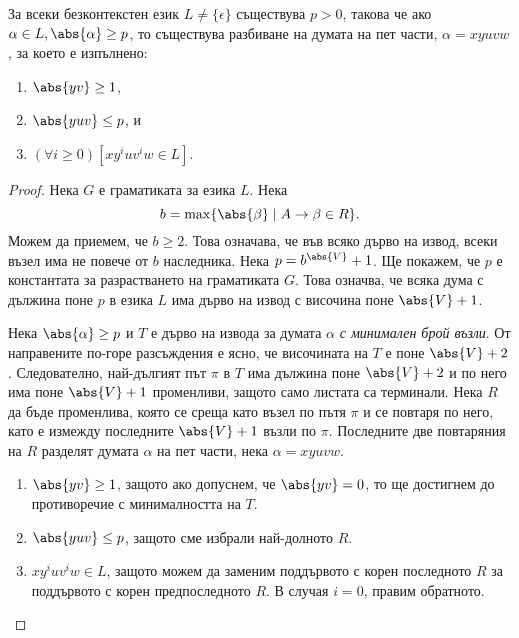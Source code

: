 \begin{lemma}
  \label{lem:pumping-context} 
  За всеки безконтекстен език $L\neq\{\epsilon\}$ съществува $p>0$, такова
  че ако $\alpha\in L, \abs{\alpha} \geq p$, то съществува разбиване на думата на пет части, $\alpha=xyuvw$,
  за което е изпълнено:
  \begin{enumerate}[1)]
  \item
    $\abs{yv}\geq 1$,
  \item
    $\abs{yuv}\leq p$, и
  \item
    $(\forall i\geq 0)[xy^iuv^iw\in L]$.
\end{enumerate}
\end{lemma}
\begin{proof}
  Нека $G$ е граматиката за езика $L$.
  Нека \[b = \max\{\abs{\beta} \mid A\rightarrow\beta\in R\}.\]
  Можем да приемем, че $b \geq 2$.
  Това означава, че във всяко дърво на извод, всеки възел има
  не повече от $b$ наследника.
  Нека $p = b^{\abs{V}}+1$. Ще покажем, че $p$ е константата за разрастването на граматиката $G$.
  Това означва, че всяка дума с дължина поне $p$ в езика $L$ има дърво на извод с височина
  поне $\abs{V} + 1$.
  
  Нека $\abs{\alpha} \geq p$ и $T$ е дърво на извода за думата $\alpha$ {\em с минимален брой възли}. 
  От направените по-горе разсъждения е ясно, че височината на $T$ е поне $\abs{V} + 2$.
  Следователно, най-дългият път $\pi$ в $T$ има дължина поне $\abs{V}+2$ и 
  по него има поне $\abs{V}+1$ променливи, защото само листата са терминали.
  Нека $R$ да бъде променлива, която се среща като възел по пътя $\pi$ и се повтаря по него, като е измежду последните $\abs{V} + 1$
  възли по $\pi$.
  Последните две повтаряния на $R$ разделят думата $\alpha$ на пет части, нека
  $\alpha = xyuvw$.
  \begin{enumerate}[1)]
  \item
    $\abs{yv}\geq 1$,
    защото ако допуснем, че $\abs{yv} = 0$,
    то ще достигнем до противоречие с минималността на $T$.
  \item
    $\abs{yuv} \leq p$, защото сме избрали най-долното $R$.
  \item
    $xy^iuv^iw \in L$, защото можем да заменим поддървото 
    с корен последното $R$ за поддървото с корен предпоследното $R$.
    В случая $i = 0$, правим обратното.
  \end{enumerate}
\end{proof}

